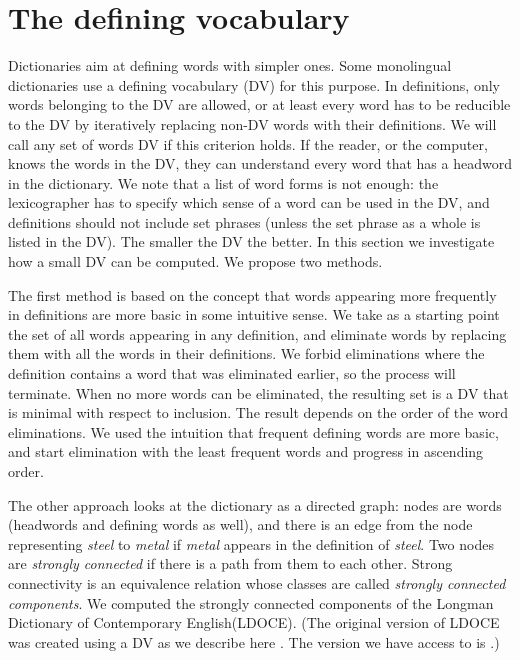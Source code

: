\documentclass[a4paper,10pt]{article}
\begin{document}
\section{The defining vocabulary}\label{sec_dv}%
Dictionaries aim at defining words with simpler ones. Some monolingual
dictionaries use a defining vocabulary (DV) for this purpose. In definitions,
only words belonging to the DV are allowed, or at least every word has to be
reducible to the DV by iteratively replacing non-DV words with their
definitions. We will call any set of words DV if this criterion holds.  If the
reader, or the computer, knows the words in the DV, they can understand every
word that has a headword in the dictionary.  We note that a list of word forms
is not enough: the lexicographer has to specify which sense of a word can be
used in the DV, and definitions should not include set phrases (unless the set
phrase as a whole is listed in the DV). The smaller the DV the better. In this
section we investigate how a small DV can be computed. We propose two methods.

The first method is based on the concept that words appearing more frequently
in definitions are more basic in some intuitive sense. We take as a starting
point the set of all words appearing in any definition, and eliminate words by
replacing them with all the words in their definitions. We forbid eliminations
where the definition contains a word that was eliminated earlier, so the
process will terminate. When no more words can be eliminated, the resulting
set is a DV that is minimal with respect to inclusion. The result depends on
the order of the word eliminations. We used the intuition that frequent
defining words are more basic, and start elimination with the least frequent
words and progress in ascending order.

The other approach looks at the dictionary as a directed graph: nodes are
words (headwords and defining words as well), and there is an edge from the
node representing \emph{steel} to \emph{metal} if \emph{metal} appears in the
definition of \emph{steel}. Two nodes are \emph{strongly connected} if there
is a path from them to each other. Strong connectivity is an equivalence
relation whose classes are called \emph{strongly connected components}. We
computed the strongly connected components of the Longman Dictionary of
Contemporary English(LDOCE). (The original version of LDOCE was created using a DV as we describe here \cite{Boguraev:1989}. The version we have access to is \cite{Bullon:2003}.)
\end{document}
